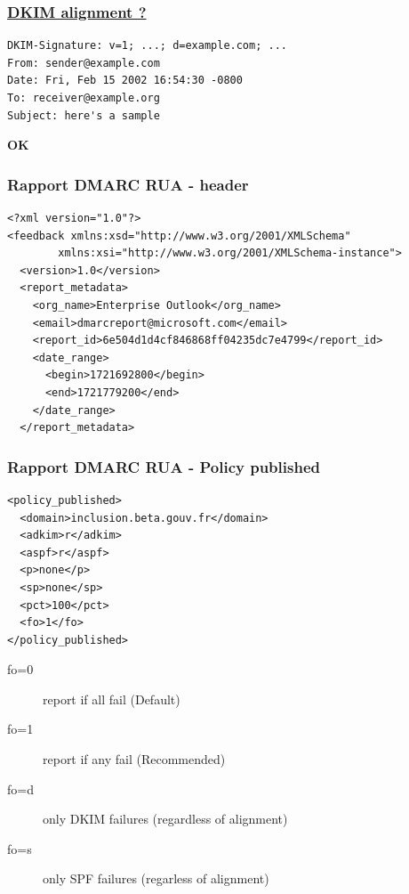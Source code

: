 \documentclass{beamer}
\begin{document}
\begin{frame}[fragile]
    \frametitle{\href{https://datatracker.ietf.org/doc/html/rfc7489\#appendix-B.1.2}{DKIM alignment ?}}

    \begin{verbatim}
DKIM-Signature: v=1; ...; d=example.com; ...
From: sender@example.com
Date: Fri, Feb 15 2002 16:54:30 -0800
To: receiver@example.org
Subject: here's a sample
    \end{verbatim}
    \pause
    \textbf{OK}
\end{frame}

\begin{frame}[fragile]
    \frametitle{Rapport DMARC RUA - header}
    \begin{verbatim}
<?xml version="1.0"?>
<feedback xmlns:xsd="http://www.w3.org/2001/XMLSchema"
        xmlns:xsi="http://www.w3.org/2001/XMLSchema-instance">
  <version>1.0</version>
  <report_metadata>
    <org_name>Enterprise Outlook</org_name>
    <email>dmarcreport@microsoft.com</email>
    <report_id>6e504d1d4cf846868ff04235dc7e4799</report_id>
    <date_range>
      <begin>1721692800</begin>
      <end>1721779200</end>
    </date_range>
  </report_metadata>
    \end{verbatim}
\end{frame}

\begin{frame}[fragile]
    \frametitle{Rapport DMARC RUA - Policy published}
    \begin{verbatim}
<policy_published>
  <domain>inclusion.beta.gouv.fr</domain>
  <adkim>r</adkim>
  <aspf>r</aspf>
  <p>none</p>
  <sp>none</sp>
  <pct>100</pct>
  <fo>1</fo>
</policy_published>
    \end{verbatim}

    \begin{description}
        \item[fo=0] report if all fail (Default)
        \item[fo=1] report if any fail (Recommended)
        \item[fo=d] only DKIM failures (regardless of alignment)
        \item[fo=s] only SPF failures (regarless of alignment)
    \end{description}
\end{frame}
\end{document}
